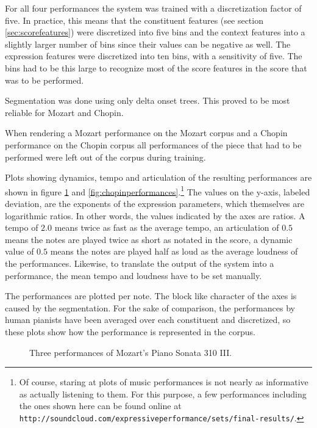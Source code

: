 \documentclass[a4paper,10pt]{article}
\begin{document}
For all four performances the system was trained with a discretization factor of five. In practice, this means that the constituent features (see section \ref{sec:scorefeatures}) were discretized into five bins and the context features into a slightly larger number of bins since their values can be negative as well. The expression features were discretized into ten bins, with a sensitivity of five. The bins had to be this large to recognize most of the score features in the score that was to be performed. 

Segmentation was done using only delta onset trees. This proved to be most reliable for Mozart and Chopin. 

When rendering a Mozart performance on the Mozart corpus and a Chopin performance on the Chopin corpus all performances of the piece that had to be performed were left out of the corpus during training. 

Plots showing dynamics, tempo and articulation of the resulting performances are shown in figure \ref{fig:mozartperformances} and \ref{fig:chopinperformances}.\footnote{Of course, staring at plots of music performances is not nearly as informative as actually listening to them. For this purpose, a few performances including the ones shown here can be found online at \texttt{http://soundcloud.com/expressiveperformance/sets/final-results/}.} The values on the y-axis, labeled deviation, are the exponents of the expression parameters, which themselves are logarithmic ratios. In other words, the values indicated by the axes are ratios. A tempo of $2.0$ means twice as fast as the average tempo, an articulation of $0.5$ means the notes are played twice as short as notated in the score, a dynamic value of $0.5$ means the notes are played half as loud as the average loudness of the performances. Likewise, to translate the output of the system into a performance, the mean tempo and loudness have to be set manually. 

The performances are plotted per note. The block like character of the axes is caused by the segmentation. For the sake of comparison, the performances by human pianists have been averaged over each constituent and discretized, so these plots show how the performance is represented in the corpus.



\begin{figure}
\centering



\caption{Three performances of Mozart's Piano Sonata 310 III.}
\label{fig:mozartperformances}
\end{figure}
\end{document}
